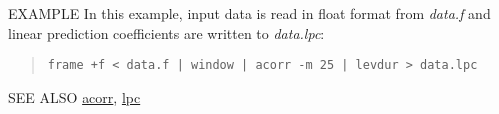 \begin{options}
\end{options}

\begin{qsection}{EXAMPLE}
In this example, input data is read in float format from
{\em data.f} and linear prediction coefficients are written
to {\em data.lpc}:
\begin{quote}
 \verb!frame +f < data.f | window | acorr -m 25 | levdur > data.lpc!
\end{quote} 
\end{qsection}

\begin{qsection}{SEE ALSO}
\hyperlink{acorr}{acorr},
\hyperlink{lpc}{lpc}
\end{qsection}
